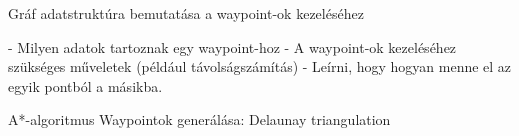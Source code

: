 \label{Chap:utvonalkereses}

Gráf adatstruktúra bemutatása a waypoint-ok kezeléséhez

- Milyen adatok tartoznak egy waypoint-hoz
- A waypoint-ok kezeléséhez szükséges műveletek (például távolságszámítás)
- Leírni, hogy hogyan menne el az egyik pontból a másikba.

A*-algoritmus
Waypointok generálása: Delaunay triangulation
